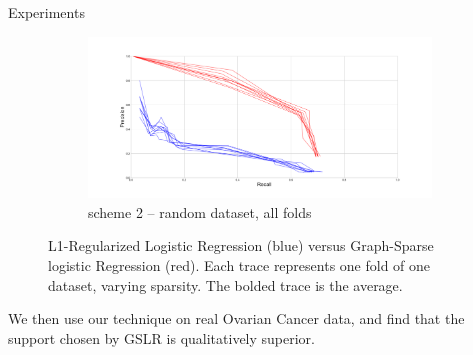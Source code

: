 \documentclass[svgnames,final]{beamer}
\begin{document}
\begin{frame}
\begin{columns}[T]
\begin{column}{.3\linewidth}
\begin{block}{Experiments}
\begin{figure}[h]
\begin{subfigure}{.5\textwidth}
		  \label{fig:sub3}
		\end{subfigure}%
		\begin{subfigure}{.5\textwidth}
		  \centering
		  \includegraphics[width=\linewidth]{images/3.pdf}
		  \caption{scheme 2 -- random dataset, all folds}
		  \label{fig:sub4}
		\end{subfigure}
		\caption{L1-Regularized Logistic Regression (blue) versus Graph-Sparse logistic Regression (red).
				Each trace represents one fold of one dataset, varying sparsity. The bolded trace is the average.}
		\label{fig:perf}
		\end{figure}

		We then use our technique on real Ovarian Cancer data,
		and find that the support chosen by GSLR is qualitatively superior.

	\end{block}

	\vspace{2cm}





\end{column}
\end{columns}
\end{frame}
\end{document}
